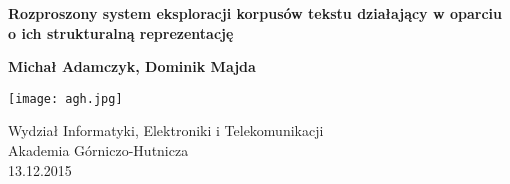 \begin{titlepage}
    \begin{center}
        \vspace*{1cm}
        
        \Large
        \textbf{Rozproszony system eksploracji korpusów tekstu działający w oparciu o ich strukturalną reprezentację}
        
        \vspace{0.5cm}
     
        \vspace{1.5cm}
        
        \textbf{Michał Adamczyk, Dominik Majda}
        
        \vfill
        

        
        \vspace{0.8cm}
        
        \texttt{[image: agh.jpg]}
        
        \Large
        Wydział Informatyki, Elektroniki i Telekomunikacji\\
        Akademia Górniczo-Hutnicza\\
        13.12.2015
        
    \end{center}
\end{titlepage}